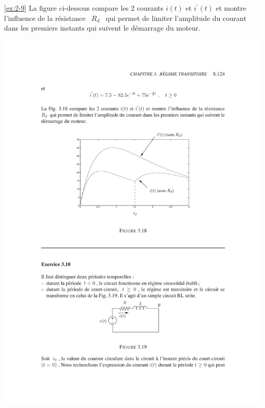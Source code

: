 \begin{solexercise}{\ref{ex:2-9}}
La figure ci-dessous compare les 2 courants $i(t)$ et $i^{'}(t)$ 
et montre l'influence de la r\'esistance \ $R_d$ \ qui permet de limiter
l'amplitude du courant dans les premiers instants qui  suivent le d\'emarrage
du moteur.
\begin{center}
	\includegraphics[width=\linewidth]{sol_exercices/ex3-9-4}
\end{center}
\end{solexercise}

